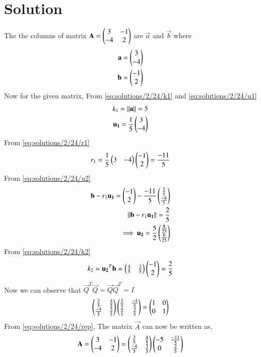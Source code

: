 \section{Solution}
The the columns of matrix $\mathbf{A}=\begin{pmatrix}3&-1\\-4&2\end{pmatrix}$ are $\vec{a}$ and $\vec{b}$ where
\begin{align}
    \mathbf{a}=\begin{pmatrix}3\\-4\end{pmatrix}\label{eq:solutions/2/24/a}\\
    \mathbf{b}=\begin{pmatrix}-1\\2\end{pmatrix}\label{eq:solutions/2/24/b}
\end{align}
Now for the given matrix, From \eqref{eq:solutions/2/24/k1} and \eqref{eq:solutions/2/24/u1}
\begin{align}
k_1=\left\lVert\mathbf{a}\right\rVert=5\\
\mathbf{u_1}=\frac{1}{5}\begin{pmatrix}3\\-4\end{pmatrix}
\end{align}
From \eqref{eq:solutions/2/24/r1}
\begin{align}
r_1=\frac{1}{5}\begin{pmatrix}3&-4\end{pmatrix}\begin{pmatrix}-1\\2\end{pmatrix}=\frac{-11}{5}
\end{align}
From \eqref{eq:solutions/2/24/u2}
\begin{align}
\mathbf{b}-r_1\mathbf{u_1}=\begin{pmatrix}-1\\2\end{pmatrix}-\frac{-11}{5}\begin{pmatrix}\frac{3}{5}\\\frac{-4}{5}\end{pmatrix}\\
\left\lVert\mathbf{b}-r_1\mathbf{u_1}\right\rVert=\frac{2}{5}\\
\implies \mathbf{u_2}=\frac{5}{2}\begin{pmatrix}\frac{8}{25}\\\frac{6}{25}\end{pmatrix}
\end{align}
From \eqref{eq:solutions/2/24/k2}
\begin{align}
    k_2=\mathbf{u_2}^T\mathbf{b}=\begin{pmatrix}\frac{4}{5}&\frac{3}{5}\end{pmatrix}\begin{pmatrix}-1\\2\end{pmatrix}=\frac{2}{5}
\end{align}
Now we can observe that $\vec{Q}^T\vec{Q}=\vec{Q}\vec{Q}^T=I$
\begin{align}
    \begin{pmatrix}\frac{3}{5}&\frac{4}{5}\\\frac{-4}{5}&\frac{3}{5}\end{pmatrix}
    \begin{pmatrix}\frac{3}{5}&\frac{-4}{5}\\\frac{4}{5}&\frac{3}{5}\end{pmatrix}=\begin{pmatrix}1&0\\0&1\end{pmatrix}
\end{align}
From \eqref{eq:solutions/2/24/rep}, The matrix $\vec{A}$ can now be written as, 
\begin{align}
    \mathbf{A}=\begin{pmatrix}3&-1\\-4&2\end{pmatrix}=\begin{pmatrix}\frac{3}{5}&\frac{4}{5}\\\frac{-4}{5}&\frac{3}{5}\end{pmatrix}
    \begin{pmatrix}-5&\frac{-11}{5}\\0&\frac{2}{5}\end{pmatrix}
\end{align}
